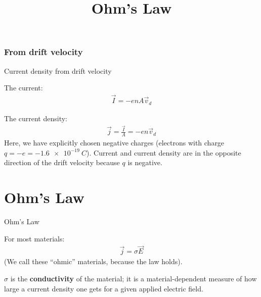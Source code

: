 \documentclass[aspectratio=169,
hyperref={colorlinks,urlcolor=blue}
]{beamer}
\begin{document}
\subsubsection{From drift velocity}
\label{subsubsec:fromdriftvelocity}
\begin{bulletframe}{Current density from drift velocity}
\item The current:
\begin{align*}
\vec I = -enA\vec v_d
\end{align*}
\item The current density:
\begin{align*}
\vec j= \frac{\vec I}{A} = -en\vec v_d
\end{align*}
Here, we have explicitly chosen negative charges (electrons with charge $q=-e=\SI{-1.6e-19}{C}$). Current and current density are in the opposite direction of the drift velocity because $q$ is negative.
\end{bulletframe}






\section{Ohm's Law}
\label{sec:ohmslaw}
\title{Ohm's Law}


\begin{frame}
\titlepage
\thispagestyle{empty}
\end{frame}





\begin{bulletframe}{Ohm's Law}
\item For most materials:
\begin{align*}
\vec j= \sigma \vec E
\end{align*}
(We call these ``ohmic'' materials, because the law holds).
\item $\sigma$ is the \textbf{conductivity} of the material; it is a material-dependent measure of how large a current density one gets for a given applied electric field.
\end{bulletframe}


\end{document}
